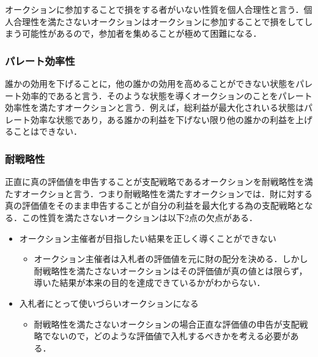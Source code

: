 オークションに参加することで損をする者がいない性質を個人合理性と言う．個人合理性を満たさないオークションはオークションに参加することで損をしてしまう可能性があるので，参加者を集めることが極めて困難になる．

\hypertarget{ux30d1ux30ecux30fcux30c8ux52b9ux7387ux6027}{%
\subsubsection{パレート効率性}\label{ux30d1ux30ecux30fcux30c8ux52b9ux7387ux6027}}

誰かの効用を下げることに，他の誰かの効用を高めることができない状態をパレート効率的であると言う．そのような状態を導くオークションのことをパレート効率性を満たすオークションと言う．例えば，総利益が最大化されいる状態はパレート効率な状態であり，ある誰かの利益を下げない限り他の誰かの利益を上げることはできない．

\hypertarget{ux8010ux6226ux7565ux6027}{%
\subsubsection{耐戦略性}\label{ux8010ux6226ux7565ux6027}}

正直に真の評価値を申告することが支配戦略であるオークションを耐戦略性を満たすオークショと言う．つまり耐戦略性を満たすオークションでは．財に対する真の評価値をそのまま申告することが自分の利益を最大化する為の支配戦略となる．この性質を満たさないオークションは以下2点の欠点がある．

\begin{itemize}
\tightlist
\item
  オークション主催者が目指したい結果を正しく導くことができない

  \begin{itemize}
  \tightlist
  \item
    オークション主催者は入札者の評価値を元に財の配分を決める．しかし耐戦略性を満たさないオークションはその評価値が真の値とは限らず，導いた結果が本来の目的を達成できているかがわからない．
  \end{itemize}
\item
  入札者にとって使いづらいオークションになる

  \begin{itemize}
  \tightlist
  \item
    耐戦略性を満たさないオークションの場合正直な評価値の申告が支配戦略でないので，どのような評価値で入札するべきかを考える必要がある．
  \end{itemize}
\end{itemize}

